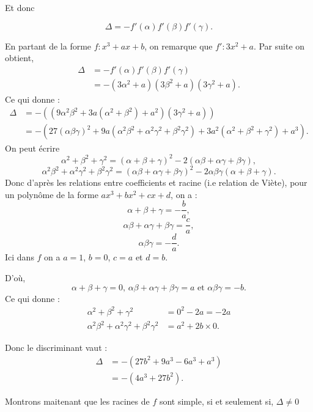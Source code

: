 \begin{demonstration}[Lemme]
Et donc 

\[
\Delta = - f'(\alpha) f'(\beta ) f'(\gamma)
.\] 

En partant de la forme $f : x^3 + ax + b$, on remarque que $f' : 3x^2 + a$. Par suite on obtient,
\begin{align*}
    \Delta &= - f'(\alpha) f'(\beta ) f'(\gamma) \\
      &= - \left( 3 \alpha^2 + a \right) \left( 3 \beta^2 + a \right) \left( 3 \gamma^2 + a \right) 
.\end{align*}
Ce qui donne :
\begin{align*}
    \Delta  &= - \left( ( 9 \alpha^2 \beta^2 + 3a ( \alpha^2 + \beta^2 ) + a^2 ) ( 3 \gamma^2 + a ) \right)  \\
       &= - \left( 27 \left( \alpha \beta \gamma \right)^2  + 9a \left( \alpha^2 \beta^2 + \alpha^2 \gamma^2 + \beta^2 \gamma^2 \right) + 3a^2 \left( \alpha^2 + \beta^2 + \gamma^2 \right) + a^3 \right) 
.\end{align*}
On peut écrire
\[
\alpha^2 + \beta^2 + \gamma^2 = \left( \alpha + \beta + \gamma \right)^2 - 2 \left( \alpha \beta + \alpha \gamma + \beta \gamma \right)
,\] 
\[
\alpha^2 \beta^2 + \alpha^2 \gamma^2 + \beta^2 \gamma^2 = \left( \alpha \beta + \alpha \gamma + \beta \gamma \right)^2 - 2\alpha \beta \gamma \left( \alpha + \beta + \gamma \right)
.\] 
Donc d'après les relations entre coefficients et racine (i.e relation de Viète), pour un polynôme de la forme $ax^3 + bx^2 + cx + d$, on a :
\[
\alpha + \beta + \gamma = - \frac{b}{a}
,\] 
\[
\alpha \beta + \alpha \gamma + \beta \gamma = \frac{c}{a}
,\] 
\[
\alpha \beta \gamma = - \frac{d}{a}
.\] 
Ici dans $f$ on a $a = 1$, $b = 0$, $c = a$ et $d = b$.

D'où,
\[
\alpha + \beta + \gamma = 0 \text{, } \alpha \beta + \alpha \gamma + \beta \gamma = a \text{ et } \alpha \beta \gamma = - b
.\] 
Ce qui donne : 
\begin{align*}
    \alpha^2 + \beta^2 + \gamma^2 &= 0^2 - 2a = -2a \\
    \alpha^2 \beta^2 + \alpha^2 \gamma^2 + \beta^2 \gamma^2 &= a^2 + 2b \times 0
.\end{align*}

Donc le discriminant vaut :
\begin{align*}
    \Delta &= - \left( 27b^2 + 9a^3 - 6a^3 + a^3  \right) \\
        &= - \left( 4a^3 + 27b^2  \right)
.\end{align*}

Montrons maitenant que les racines de $f$ sont simple, si et seulement si, $\Delta \neq 0$


\end{demonstration}
